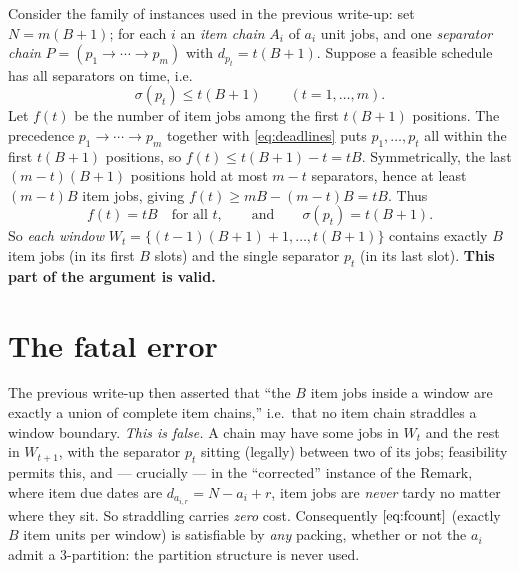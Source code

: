 \documentclass{amsart}
\theoremstyle{definition}
\theoremstyle{remark}
\begin{document}
Consider the family of instances used in the previous write-up: set $N=m(B+1)$; for each
$i$ an \emph{item chain} $A_i$ of $a_i$ unit jobs, and one \emph{separator chain}
$P=(p_1\to\cdots\to p_m)$ with $d_{p_t}=t(B+1)$. Suppose a feasible schedule has all
separators on time, i.e.
\begin{equation}\label{eq:deadlines}
   \sigma(p_t)\le t(B+1)\qquad(t=1,\dots,m).
\end{equation}
Let $f(t)$ be the number of item jobs among the first $t(B+1)$ positions. The precedence
$p_1\to\cdots\to p_m$ together with \eqref{eq:deadlines} puts $p_1,\dots,p_t$ all within
the first $t(B+1)$ positions, so $f(t)\le t(B+1)-t=tB$. Symmetrically, the last
$(m-t)(B+1)$ positions hold at most $m-t$ separators, hence at least $(m-t)B$ item jobs,
giving $f(t)\ge mB-(m-t)B=tB$. Thus
\begin{equation}\label{eq:fcount}
   f(t)=tB\quad\text{for all }t,\qquad\text{and}\qquad \sigma(p_t)=t(B+1).
\end{equation}
So \emph{each window} $W_t=\{(t-1)(B+1)+1,\dots,t(B+1)\}$ contains exactly $B$ item jobs
(in its first $B$ slots) and the single separator $p_t$ (in its last slot).
\textbf{This part of the argument is valid.}

\section{The fatal error}\label{sec:error}

The previous write-up then asserted that ``the $B$ item jobs inside a window are exactly a
union of complete item chains,'' i.e.\ that no item chain straddles a window boundary.
\emph{This is false.} A chain may have some jobs in $W_t$ and the rest in $W_{t+1}$, with
the separator $p_t$ sitting (legally) between two of its jobs; feasibility permits this,
and --- crucially --- in the ``corrected'' instance of the Remark, where item due dates
are $d_{a_{i,r}}=N-a_i+r$, item jobs are \emph{never} tardy no matter where they sit. So
straddling carries \emph{zero} cost. Consequently $\eqref{eq:fcount}$ (exactly $B$ item
units per window) is satisfiable by \emph{any} packing, whether or not the $a_i$ admit a
$3$-partition: the partition structure is never used.
\end{document}
